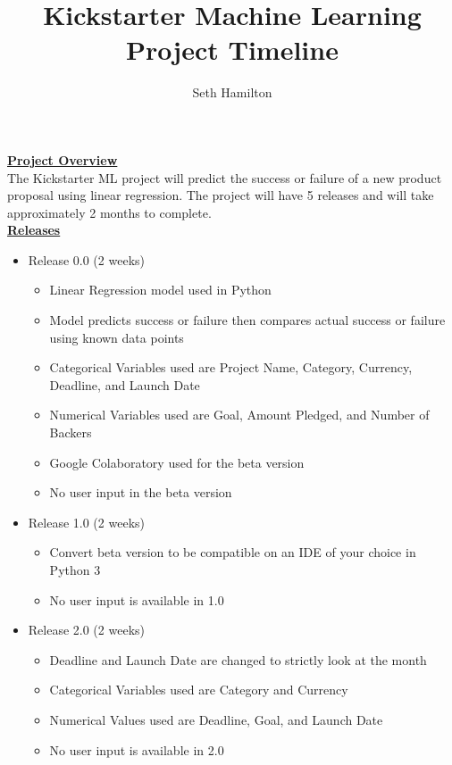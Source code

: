 \documentclass[12pt,final]{article}
\title{Kickstarter Machine Learning Project Timeline}
\author{Seth Hamilton}
\begin{document}
\date{}
\maketitle
\noindent
\underline{\textbf{Project Overview}}\\

The Kickstarter ML project will predict the success or failure of a new product proposal using linear regression. The project will have 5 releases and will take approximately 2 months to complete.\\

\underline{\textbf{Releases}}\\
\begin{itemize}
\item Release 0.0 (2 weeks) 
\begin{itemize}
\item Linear Regression model used in Python
\item Model predicts success or failure then compares actual success or failure using known data points 
\item Categorical Variables used are Project Name, Category, Currency, Deadline, and Launch Date
\item Numerical Variables used are Goal, Amount Pledged, and Number of Backers
\item Google Colaboratory used for the beta version
\item No user input in the beta version
\end{itemize}
\item Release 1.0 (2 weeks)
\begin{itemize}
\item Convert beta version to be compatible on an IDE of your choice in Python 3
\item No user input is available in 1.0
\end{itemize}
\item Release 2.0 (2 weeks)
\begin{itemize}
\item Deadline and Launch Date are changed to strictly look at the month
\item Categorical Variables used are Category and Currency
\item Numerical Values used are Deadline, Goal, and Launch Date
\item No user input is available in 2.0

\end{itemize}
\pagebreak


\end{itemize}
\end{document}
